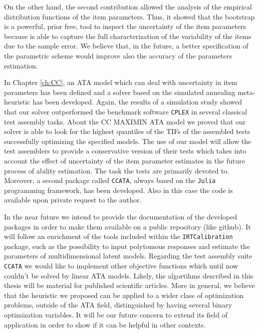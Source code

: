 On the other hand, the second contribution allowed the analysis of the empirical distribution functions of the item parameters. Thus, it showed that the bootstrap is a powerful, prior free, tool to inspect the uncertainty of the item parameters because is able to capture the full characterization of the variability of the items due to the sample error. We believe that, in the future, a better specification of the parametric scheme would improve also the accuracy of the parameters estimation.

In Chapter \ref{ch:CC}, an ATA model which can deal with uncertainty in item parameters has been defined and a solver based on the simulated annealing meta-heuristic has been developed.
Again, the results of a simulation study showed that our solver outperformed the benchmark software \texttt{CPLEX} in several classical test assembly tasks. About the CC MAXIMIN ATA model we proved that our solver is able to look for the highest quantiles of the TIFs of the assembled tests successfully optimizing the specified models. The use of our model will allow the test assemblers to provide a conservative version of their tests which takes into account the effect of uncertainty of the item parameter estimates in the future process of ability estimation. The task the tests are primarily devoted to.
Moreover, a second package called \texttt{CCATA}, always based on the \texttt{Julia} programming framework, has been developed. Also in this case the code is available upon private request to the author. 

In the near future we intend to provide the documentation of the developed packages in order to make them available on a public repository (like github). It will follow an enrichment of the tools included within the \texttt{IRTCalibration} package, such as the possibility to input polytomous responses and estimate the parameters of multidimensional latent models. 
Regarding the test assembly suite \texttt{CCATA} we would like to implement other objective functions which until now couldn't be solved by linear ATA models.
Likely, the algortihms described in this thesis will be material for published scientific articles.
More in general, we believe that the heuristic we proposed can be applied to a wider class of optimization problems, outside of the ATA field, distinguished by having several binary optimization variables. It will be our future concern to extend its field of application in order to show if it can be helpful in other contexts.




